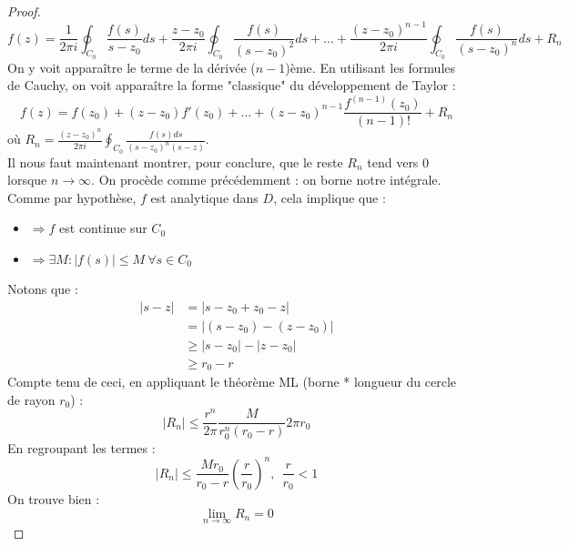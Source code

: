 \begin{proof}
	\begin{equation}
	f(z) = \frac{1}{2\pi i}\oint_{C_0}\frac{f(s)}{s-z_0}ds + \frac{z-z_0}{2\pi i}\oint_{C_0}
	\frac{f(s)}{(s-z_0)^2}ds + \dots + \frac{(z-z_0)^{n-1}}{2\pi i}\oint_{C_0}\frac{f(s)}{(s
	-z_0)^n}ds + R_n
	\end{equation}
	On y voit apparaître le terme de la dérivée ($n-1$)ème. En utilisant les formules de 
	Cauchy, on voit apparaître la forme "classique" du développement de Taylor :
	\begin{equation}
	f(z) = f(z_0) + (z-z_0)f'(z_0) + \dots + (z-z_0)^{n-1}\frac{f^{(n-1)}(z_0)}{(n-1)!}+R_n
	\end{equation}
	où $R_n = \frac{(z-z_0)^n}{2\pi i}\oint_{C_0}\frac{f(s)ds}{(s-z_0)^n(s-z)}$.\\
	
	Il nous faut maintenant montrer, pour conclure, que le reste $R_n$ tend vers 0 lorsque $n
	\rightarrow \infty$. On procède comme précédemment : on borne notre intégrale. Comme par
	hypothèse, $f$ est analytique dans $D$, cela implique que :
	\begin{itemize}
	\item $\Rightarrow f$ est continue sur $C_0$
	\item $\Rightarrow \exists M : |f(s)| \leq M\ \forall s \in C_0$
	\end{itemize}
	Notons que :
	\begin{equation}
	\begin{array}{ll}
	|s-z| &= |s-z_0+z_0-z|\\
	 &= |(s-z_0)-(z-z_0)|\\
	 &\geq |s-z_0|-|z-z_0|\\
	 &\geq r_0-r
	\end{array}
	\end{equation}
	Compte tenu de ceci, en appliquant le théorème ML (borne * longueur du cercle
	 de rayon $r_0$) :
	\begin{equation}
	|R_n| \leq \frac{r^n}{2\pi}\frac{M}{r^n_0(r_0-r)}2\pi r_0
	\end{equation}
	En regroupant les termes :
	\begin{equation}
	|R_n| \leq \frac{Mr_0}{r_0-r}\left(\dfrac{r}{r_0}\right)^n, \ \ \frac{r}{r_0}<1
	\end{equation}
	On trouve bien :
	\begin{equation}
	\lim\limits_{n\rightarrow\infty} R_n = 0
	\end{equation}
	\end{proof}
	
